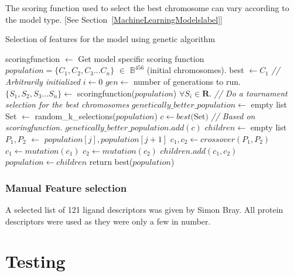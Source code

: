 \documentclass[11pt]{article}
\begin{document}
The scoring function used to select the best chromosome can vary according to the model type. [See Section~\ref{MachineLearningModelslabel}]

\begin{algorithm}
\caption{Selection of features for the model using genetic algorithm \cite{genetic_algorithm}}
\label{alg:GeneticAlgo}
\begin{algorithmic}[1]
\State scoringfunction $\gets$ Get model specific scoring function
\State $ population = \{C_1, C_2, C_3... C_n\}$ $\in$ $\mathbb{B}^{456}$ (initial chromosomes).
\State best $\gets C_1$  \textit{// Arbitrarily initialized}
\State $i \gets 0$
\State $gen \gets$ number of generations to run.
          \State $\{S_1, S_2, S_3... S_n\} \gets$ scoringfunction($population$) $\forall S_i \in \mathbf{R}$.
          \State \textit{// Do a tournament selection for the best chromosomes}
          \State $genetically\_better\_population \gets$ empty list
              \State Set $\gets$ random\_k\_selections($population$)
              \State $c \gets best($Set$)$ \textit{// Based on scoringfunction.}
              \State $genetically\_better\_population.add(c)$
          \EndFor
          \State $children \gets$ empty list
              \State $P_1, P_2$ $\gets$ $population[j], population[j+1]$
              \State $c_1, c_2 \gets crossover(P_1, P_2)$
              \State $c_1 \gets mutation(c_1)$
              \State $c_2 \gets mutation(c_2)$
              \State $children.add(c_1, c_2)$
          \EndFor
          \State $population \gets children$
      \EndFor
\State return best($population$)
\EndProcedure
\end{algorithmic}
\end{algorithm}

\subsubsection{Manual Feature selection}
A selected list of 121 ligand descriptors was given by Simon Bray. 
All protein descriptors were used as they were only a few in number.

\section{Testing}
\end{document}
